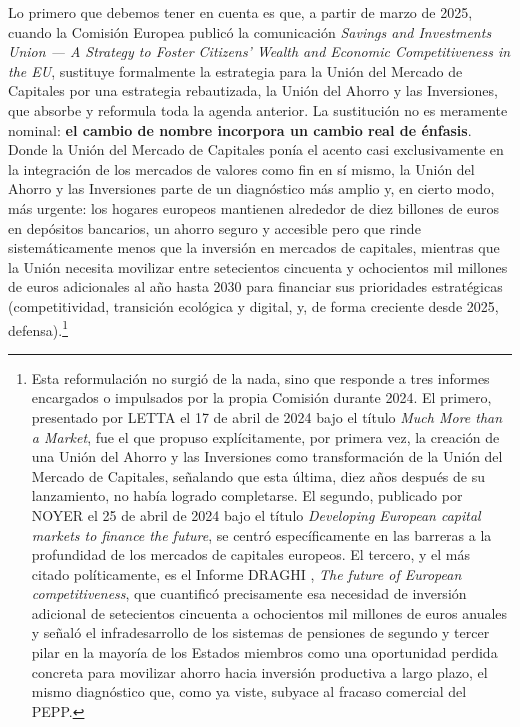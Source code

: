 \documentclass[10pt,a4paper]{article}
\begin{document}
{Lo primero que debemos tener en cuenta es que, a partir de marzo de 2025, cuando la Comisión Europea publicó la comunicación \textit{Savings and Investments Union — A Strategy to Foster Citizens' Wealth and Economic Competitiveness in the EU}, sustituye formalmente la estrategia para la Unión del Mercado de Capitales por una estrategia rebautizada, la Unión del Ahorro y las Inversiones, que absorbe y reformula toda la agenda anterior. La sustitución no es meramente nominal: \textbf{el cambio de nombre incorpora un cambio real de énfasis}. Donde la Unión del Mercado de Capitales ponía el acento casi exclusivamente en la integración de los mercados de valores como fin en sí mismo, la Unión del Ahorro y las Inversiones parte de un diagnóstico más amplio y, en cierto modo, más urgente: los hogares europeos mantienen alrededor de diez billones de euros en depósitos bancarios, un ahorro seguro y accesible pero que rinde sistemáticamente menos que la inversión en mercados de capitales, mientras que la Unión necesita movilizar entre setecientos cincuenta y ochocientos mil millones de euros adicionales al año hasta 2030 para financiar sus prioridades estratégicas (competitividad, transición ecológica y digital, y, de forma creciente desde 2025, defensa).\footnote{%
    Esta reformulación no surgió de la nada, sino que responde a tres informes encargados o impulsados por la propia Comisión durante 2024. El primero, presentado por LETTA el 17 de abril de 2024 bajo el título \textit{Much More than a Market}, fue el que propuso explícitamente, por primera vez, la creación de una Unión del Ahorro y las Inversiones como transformación de la Unión del Mercado de Capitales, señalando que esta última, diez años después de su lanzamiento, no había logrado completarse. El segundo, publicado por NOYER el 25 de abril de 2024 bajo el título \textit{Developing European capital markets to finance the future}, se centró específicamente en las barreras a la profundidad de los mercados de capitales europeos. El tercero, y el más citado políticamente, es el Informe DRAGHI , \textit{The future of European competitiveness}, que cuantificó precisamente esa necesidad de inversión adicional de setecientos cincuenta a ochocientos mil millones de euros anuales y señaló el infradesarrollo de los sistemas de pensiones de segundo y tercer pilar en la mayoría de los Estados miembros como una oportunidad perdida concreta para movilizar ahorro hacia inversión productiva a largo plazo, el mismo diagnóstico que, como ya viste, subyace al fracaso comercial del PEPP.
} 

}
\end{document}
